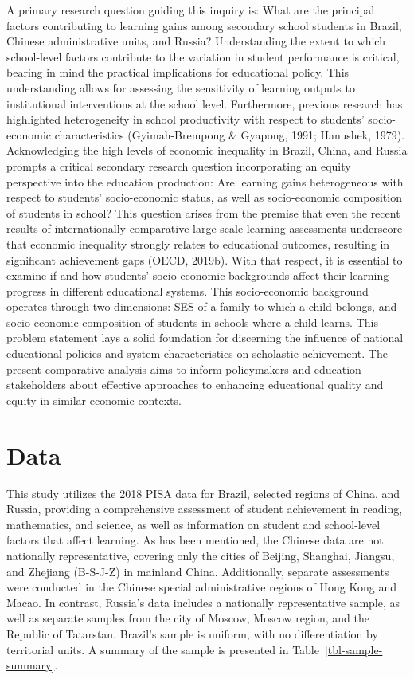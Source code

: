 \documentclass[
]{article}
\begin{document}
A primary research question guiding this inquiry is: What are the
principal factors contributing to learning gains among secondary school
students in Brazil, Chinese administrative units, and Russia?
Understanding the extent to which school-level factors contribute to the
variation in student performance is critical, bearing in mind the
practical implications for educational policy. This understanding allows
for assessing the sensitivity of learning outputs to institutional
interventions at the school level. Furthermore, previous research has
highlighted heterogeneity in school productivity with respect to
students' socio-economic characteristics (Gyimah-Brempong \& Gyapong,
1991; Hanushek, 1979). Acknowledging the high levels of economic
inequality in Brazil, China, and Russia prompts a critical secondary
research question incorporating an equity perspective into the education
production: Are learning gains heterogeneous with respect to students'
socio-economic status, as well as socio-economic composition of students
in school? This question arises from the premise that even the recent
results of internationally comparative large scale learning assessments
underscore that economic inequality strongly relates to educational
outcomes, resulting in significant achievement gaps (OECD, 2019b). With
that respect, it is essential to examine if and how students'
socio-economic backgrounds affect their learning progress in different
educational systems. This socio-economic background operates through two
dimensions: SES of a family to which a child belongs, and socio-economic
composition of students in schools where a child learns. This problem
statement lays a solid foundation for discerning the influence of
national educational policies and system characteristics on scholastic
achievement. The present comparative analysis aims to inform
policymakers and education stakeholders about effective approaches to
enhancing educational quality and equity in similar economic contexts.

\section{Data}\label{data}

This study utilizes the 2018 PISA data for Brazil, selected regions of
China, and Russia, providing a comprehensive assessment of student
achievement in reading, mathematics, and science, as well as information
on student and school-level factors that affect learning. As has been
mentioned, the Chinese data are not nationally representative, covering
only the cities of Beijing, Shanghai, Jiangsu, and Zhejiang (B-S-J-Z) in
mainland China. Additionally, separate assessments were conducted in the
Chinese special administrative regions of Hong Kong and Macao. In
contrast, Russia's data includes a nationally representative sample, as
well as separate samples from the city of Moscow, Moscow region, and the
Republic of Tatarstan. Brazil's sample is uniform, with no
differentiation by territorial units. A summary of the sample is
presented in Table~\ref{tbl-sample-summary}.
\end{document}
